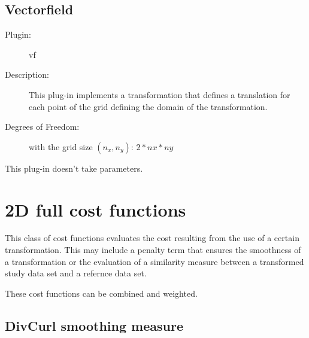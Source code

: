    
   \subsection{Vectorfield}
   \label{transform2d:vf}
   
   \begin{description}
   
   \item [Plugin:] vf
   \item [Description:] This plug-in implements a transformation that defines a translation for 
                        each point of the grid defining the domain of the transformation. 
   \item [Degrees of Freedom:] with the grid size $(n_x,n_y)$: $2* nx * ny$
  
   \end{description}
   This plug-in doesn't  take parameters. 

\section{2D full cost functions}  \label{sec:2dfullcost}
  
  This class of cost functions evaluates the cost resulting from the 
  use of a certain transformation. This may include a penalty term that ensures 
  the smoothness of a transformation or the evaluation of a similarity measure 
  between a transformed study data set and a refernce data set. 
  
  These cost functions can be combined and weighted. 
  

      
   \subsection{DivCurl smoothing measure}
   \label{fullcost2d:divcurl}
   
